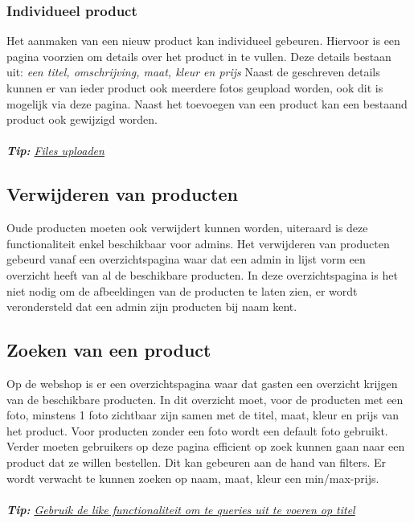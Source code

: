 \documentclass{article}
\begin{document}
\subsubsection{Individueel product}
Het aanmaken van een nieuw product kan individueel gebeuren. Hiervoor is een pagina voorzien om details over het product in te vullen. Deze details bestaan uit: \textit{een titel, omschrijving, maat, kleur en prijs} Naast de geschreven details kunnen er van ieder product ook meerdere fotos geupload worden, ook dit is mogelijk via deze pagina. Naast het toevoegen van een product kan een bestaand product ook gewijzigd worden.
\\
\\


\textit{\textbf{Tip:} \href{https://phoenixframework.readme.io/v0.14.0/docs/file-uploads}{Files uploaden}}


\subsection{Verwijderen van producten}
Oude producten moeten ook verwijdert kunnen worden, uiteraard is deze functionaliteit enkel beschikbaar voor admins. Het verwijderen van producten gebeurd vanaf een overzichtspagina waar dat een admin in lijst vorm een overzicht heeft van al de beschikbare producten. In deze overzichtspagina is het niet nodig om de afbeeldingen van de producten te laten zien, er wordt verondersteld dat een admin zijn producten bij naam kent.

\subsection{Zoeken van een product}
Op de webshop is er een overzichtspagina waar dat gasten een overzicht krijgen van de beschikbare producten. In dit overzicht moet, voor de producten met een foto, minstens 1 foto zichtbaar zijn samen met de titel, maat, kleur en prijs van het product. Voor producten zonder een foto wordt een default foto gebruikt. Verder moeten gebruikers op deze pagina efficient op zoek kunnen gaan naar een product dat ze willen bestellen. Dit kan gebeuren aan de hand van filters. Er wordt verwacht te kunnen zoeken op naam, maat, kleur een min/max-prijs. 
\\
\\
\textit{\textbf{Tip:} \href{https://hexdocs.pm/ecto/Ecto.Query.API.html}{Gebruik de like functionaliteit om te queries uit te voeren op titel}}
\end{document}
